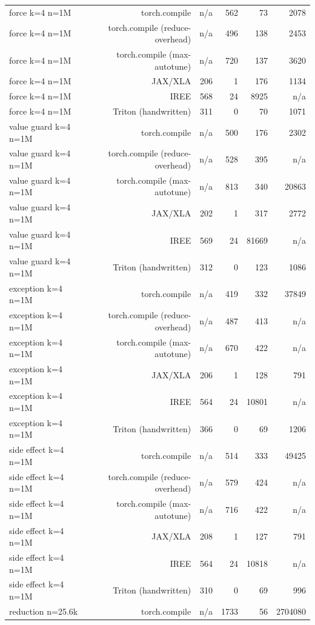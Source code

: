 \begin{tabular}{lrrrrr}
force k=4 n=1M & torch.compile & n/a & 562 & 73 & 2078 \\
force k=4 n=1M & torch.compile (reduce-overhead) & n/a & 496 & 138 & 2453 \\
force k=4 n=1M & torch.compile (max-autotune) & n/a & 720 & 137 & 3620 \\
force k=4 n=1M & JAX/XLA & 206 & 1 & 176 & 1134 \\
force k=4 n=1M & IREE & 568 & 24 & 8925 & n/a \\
force k=4 n=1M & Triton (handwritten) & 311 & 0 & 70 & 1071 \\
value guard k=4 n=1M & torch.compile & n/a & 500 & 176 & 2302 \\
value guard k=4 n=1M & torch.compile (reduce-overhead) & n/a & 528 & 395 & n/a \\
value guard k=4 n=1M & torch.compile (max-autotune) & n/a & 813 & 340 & 20863 \\
value guard k=4 n=1M & JAX/XLA & 202 & 1 & 317 & 2772 \\
value guard k=4 n=1M & IREE & 569 & 24 & 81669 & n/a \\
value guard k=4 n=1M & Triton (handwritten) & 312 & 0 & 123 & 1086 \\
exception k=4 n=1M & torch.compile & n/a & 419 & 332 & 37849 \\
exception k=4 n=1M & torch.compile (reduce-overhead) & n/a & 487 & 413 & n/a \\
exception k=4 n=1M & torch.compile (max-autotune) & n/a & 670 & 422 & n/a \\
exception k=4 n=1M & JAX/XLA & 206 & 1 & 128 & 791 \\
exception k=4 n=1M & IREE & 564 & 24 & 10801 & n/a \\
exception k=4 n=1M & Triton (handwritten) & 366 & 0 & 69 & 1206 \\
side effect k=4 n=1M & torch.compile & n/a & 514 & 333 & 49425 \\
side effect k=4 n=1M & torch.compile (reduce-overhead) & n/a & 579 & 424 & n/a \\
side effect k=4 n=1M & torch.compile (max-autotune) & n/a & 716 & 422 & n/a \\
side effect k=4 n=1M & JAX/XLA & 208 & 1 & 127 & 791 \\
side effect k=4 n=1M & IREE & 564 & 24 & 10818 & n/a \\
side effect k=4 n=1M & Triton (handwritten) & 310 & 0 & 69 & 996 \\
reduction n=25.6k & torch.compile & n/a & 1733 & 56 & 2704080 \\

\end{tabular}
